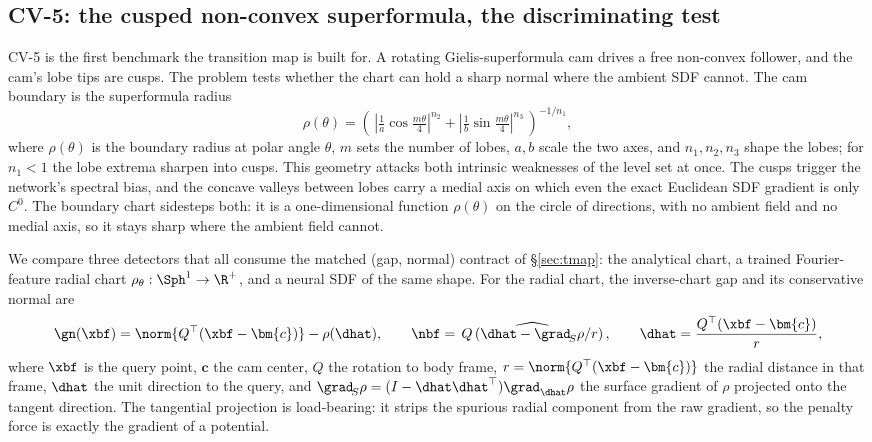 \subsection{CV-5: the cusped non-convex superformula, the discriminating test}\label{sec:verif_cv5}

CV-5 is the first benchmark the transition map is built for. A rotating Gielis-superformula cam drives a
free non-convex follower, and the cam's lobe tips are cusps. The problem tests whether the chart can
hold a sharp normal where the ambient SDF cannot. The cam boundary is the superformula radius
\citep{gielis2003generic}
%
\begin{equation}\label{eq:superformula}
\rho(\theta) = \left(\,\left|\tfrac{1}{a}\cos\tfrac{m\theta}{4}\right|^{n_2}
+\left|\tfrac{1}{b}\sin\tfrac{m\theta}{4}\right|^{n_3}\,\right)^{-1/n_1},
\end{equation}
%
where $\rho(\theta)$ is the boundary radius at polar angle $\theta$, $m$ sets the number of lobes,
$a,b$ scale the two axes, and $n_1,n_2,n_3$ shape the lobes; for $n_1<1$ the lobe extrema sharpen into
cusps. This geometry attacks both intrinsic weaknesses of the level set at once. The cusps trigger the
network's spectral bias, and the concave valleys between lobes carry a medial axis on which even the
exact Euclidean SDF gradient is only $C^0$. The boundary chart sidesteps both: it is a one-dimensional
function $\rho(\theta)$ on the circle of directions, with no ambient field and no medial axis, so it
stays sharp where the ambient field cannot.

We compare three detectors that all consume the matched (gap, normal) contract of \S\ref{sec:tmap}: the
analytical chart, a trained Fourier-feature radial chart $\rho_\theta:\Sph^1\to\R^{+}$, and a neural
SDF of the same shape. For the radial chart, the inverse-chart gap and its conservative normal are
%
\begin{equation}\label{eq:radial_gap_cv5}
\gn(\xbf) = \norm{Q^{\top}(\xbf-\bm{c})} - \rho(\dhat),\qquad
\nbf = \widehat{\,Q\,(\dhat - \grad_{\!S}\rho/r)\,},\qquad
\dhat = \frac{Q^{\top}(\xbf-\bm{c})}{r},
\end{equation}
%
where $\xbf$ is the query point, $\bm{c}$ the cam center, $Q$ the rotation to body frame, $r =
\norm{Q^{\top}(\xbf-\bm{c})}$ the radial distance in that frame, $\dhat$ the unit direction to the
query, and $\grad_{\!S}\rho=(I-\dhat\dhat^{\top})\grad_{\dhat}\rho$ the surface gradient of $\rho$
projected onto the tangent direction. The tangential projection is load-bearing: it strips the spurious
radial component from the raw gradient, so the penalty force is exactly the gradient of a potential.

